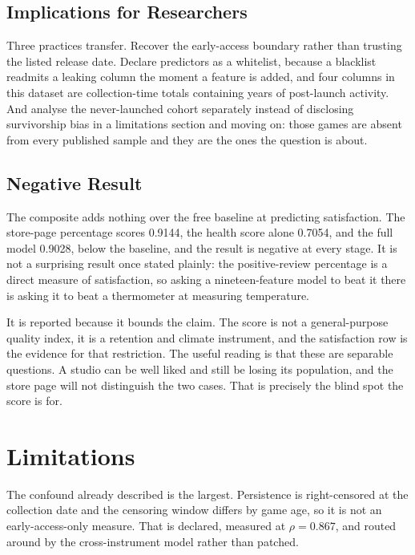 \documentclass[sigconf]{acmart}
\begin{document}
\subsection{Implications for Researchers}
\label{sec:discResearchers}

Three practices transfer. Recover the early-access boundary rather than trusting the listed release
date. Declare predictors as a whitelist, because a blacklist readmits a leaking column the moment a
feature is added, and four columns in this dataset are collection-time totals containing years of
post-launch activity. And analyse the never-launched cohort separately instead of disclosing
survivorship bias in a limitations section and moving on: those games are absent from every
published sample and they are the ones the question is about.

\subsection{Negative Result}
\label{sec:discNegative}

The composite adds nothing over the free baseline at predicting satisfaction. The store-page
percentage scores 0.9144, the health score alone 0.7054, and the full model 0.9028, below the
baseline, and the result is negative at every stage. It is not a surprising result once stated
plainly: the positive-review percentage is a direct measure of satisfaction, so asking a
nineteen-feature model to beat it there is asking it to beat a thermometer at measuring
temperature.

It is reported because it bounds the claim. The score is not a general-purpose quality index, it is
a retention and climate instrument, and the satisfaction row is the evidence for that restriction.
The useful reading is that these are separable questions. A studio can be well liked and still be
losing its population, and the store page will not distinguish the two cases. That is precisely the
blind spot the score is for.

\section{Limitations}
\label{sec:limitations}

The confound already described is the largest. Persistence is right-censored at the collection date
and the censoring window differs by game age, so it is not an early-access-only measure. That is
declared, measured at $\rho = 0.867$, and routed around by the cross-instrument model rather than
patched.
\end{document}
